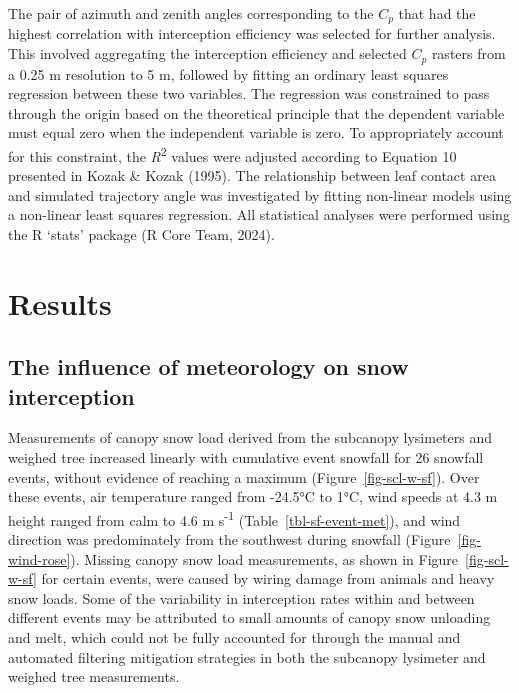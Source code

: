 \documentclass[
  letterpaper,
]{tex/uofsthesis-cs}
\begin{document}
The pair of azimuth and zenith angles corresponding to the \(C_p\) that
had the highest correlation with interception efficiency was selected
for further analysis. This involved aggregating the interception
efficiency and selected \(C_p\) rasters from a 0.25 m resolution to 5 m,
followed by fitting an ordinary least squares regression between these
two variables. The regression was constrained to pass through the origin
based on the theoretical principle that the dependent variable must
equal zero when the independent variable is zero. To appropriately
account for this constraint, the \emph{R}\textsuperscript{2} values were
adjusted according to Equation 10 presented in Kozak \& Kozak (1995).
The relationship between leaf contact area and simulated trajectory
angle was investigated by fitting non-linear models using a non-linear
least squares regression. All statistical analyses were performed using
the R `stats' package (R Core Team, 2024).

\section{Results}\label{results}

\subsection{The influence of meteorology on snow
interception}\label{the-influence-of-meteorology-on-snow-interception}

Measurements of canopy snow load derived from the subcanopy lysimeters
and weighed tree increased linearly with cumulative event snowfall for
26 snowfall events, without evidence of reaching a maximum
(Figure~\ref{fig-scl-w-sf}). Over these events, air temperature ranged
from -24.5°C to 1°C, wind speeds at 4.3 m height ranged from calm to 4.6
m s\textsuperscript{-1} (Table~\ref{tbl-sf-event-met}), and wind
direction was predominately from the southwest during snowfall
(Figure~\ref{fig-wind-rose}). Missing canopy snow load measurements, as
shown in Figure~\ref{fig-scl-w-sf} for certain events, were caused by
wiring damage from animals and heavy snow loads. Some of the variability
in interception rates within and between different events may be
attributed to small amounts of canopy snow unloading and melt, which
could not be fully accounted for through the manual and automated
filtering mitigation strategies in both the subcanopy lysimeter and
weighed tree measurements.
\end{document}
